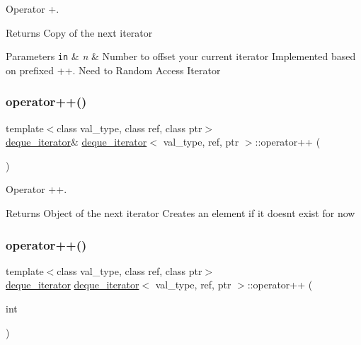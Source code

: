 Operator +. 

\begin{DoxyReturn}{Returns}
Copy of the next iterator 
\end{DoxyReturn}

\begin{DoxyParams}[1]{Parameters}
\mbox{\tt in}  & {\em n} & Number to offset your current iterator Implemented based on prefixed ++. Need to Random Access Iterator \\
\hline
\end{DoxyParams}
\hypertarget{structdeque__iterator_ae15f463b8188f48d74a679935cd968ba}{}\label{structdeque__iterator_ae15f463b8188f48d74a679935cd968ba} 
\subsubsection{\texorpdfstring{operator++()}{operator++()}\hspace{0.1cm}{\footnotesize\ttfamily [1/2]}}
{\footnotesize\ttfamily template$<$class val\+\_\+type, class ref, class ptr$>$ \\
\hyperlink{structdeque__iterator}{deque\+\_\+iterator}\& \hyperlink{structdeque__iterator}{deque\+\_\+iterator}$<$ val\+\_\+type, ref, ptr $>$\+::operator++ (\begin{DoxyParamCaption}{ }\end{DoxyParamCaption})\hspace{0.3cm}{\ttfamily [inline]}}



Operator ++. 

\begin{DoxyReturn}{Returns}
Object of the next iterator Creates an element if it doesn\textquotesingle{}t exist for now 
\end{DoxyReturn}
\hypertarget{structdeque__iterator_ab00c940267f110d87de358ba0383a9dc}{}\label{structdeque__iterator_ab00c940267f110d87de358ba0383a9dc} 
\subsubsection{\texorpdfstring{operator++()}{operator++()}\hspace{0.1cm}{\footnotesize\ttfamily [2/2]}}
{\footnotesize\ttfamily template$<$class val\+\_\+type, class ref, class ptr$>$ \\
\hyperlink{structdeque__iterator}{deque\+\_\+iterator} \hyperlink{structdeque__iterator}{deque\+\_\+iterator}$<$ val\+\_\+type, ref, ptr $>$\+::operator++ (\begin{DoxyParamCaption}\item[{int}]{ }\end{DoxyParamCaption})\hspace{0.3cm}{\ttfamily [inline]}}



